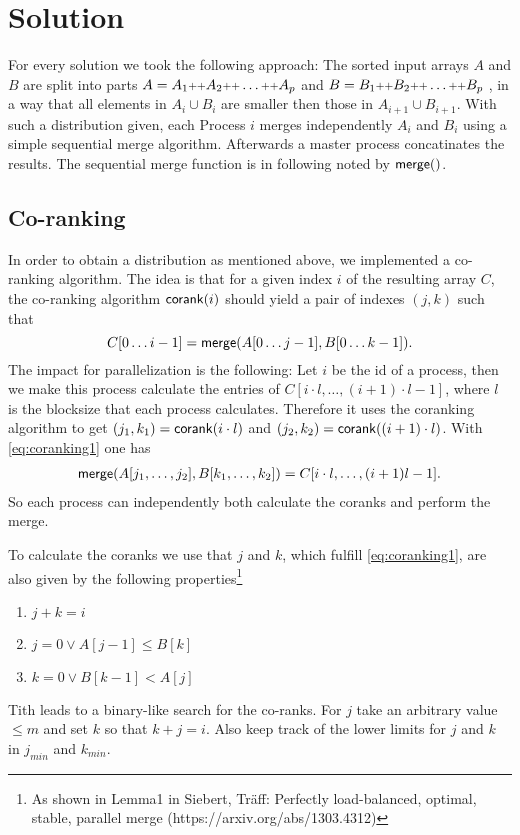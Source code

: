 \section{Solution}
For every solution we took the following approach:
The sorted input arrays $A$ and $B$ are split into parts
$A = A_1 \concat A_2 \concat \ldots \concat A_p$  and
$B = B_1 \concat B_2 \concat \ldots \concat B_p$
, in a way that all elements in $A_i \cup B_i$ are smaller then those in $A_{i+1} \cup B_{i+1}$. 
With such a distribution given, each Process $i$ merges independently $A_i$ and $B_i$ using a simple sequential merge algorithm.
Afterwards a master process concatinates the results.
The sequential merge function is in following noted by $\merge()$.

\subsection{Co-ranking}
In order to obtain a distribution as mentioned above, we implemented a co-ranking algorithm.
The idea is that for a given index $i$ of the resulting array $C$, 
the co-ranking algorithm $\corank(i)$ should yield a pair of indexes $(j,k)$
such that
\begin{equation}\label{eq:coranking1}
  C[0\ldots i-1] = \merge(A[0\ldots j-1],B[0\ldots k-1]).
\end{equation}
The impact for parallelization is the following:
Let $i$ be the id of a process,
then we make this process calculate the entries of $C[i \cdot l, \ldots, (i+1)\cdot l - 1]$,
where $l$ is the blocksize that each process calculates.
Therefore it uses the coranking algorithm to get
$(j_1,k_1) = \corank(i\cdot l)$ and $(j_2,k_2) = \corank((i+1)\cdot l)$.
With \eqref{eq:coranking1} one has
\begin{align*}
  \merge(A[j_1,\ldots,j_2],B[k_1,\ldots,k_2]) = C[i \cdot l,\ldots, (i+1)l - 1].
\end{align*}
So each process can independently both calculate the coranks and perform the merge.

To calculate the coranks we use that
$j$ and $k$, which fulfill \eqref{eq:coranking1}, are also given by the following
properties\footnote{As shown in Lemma1 in Siebert, Träff: Perfectly load-balanced, optimal, stable, parallel merge (https://arxiv.org/abs/1303.4312)}
\begin{enumerate}
  \item $j + k = i$
  \item $j = 0 \vee A[j-1] \leq B[k]$\label{first_inequal}
  \item $k = 0 \vee B[k-1] < A[j]$
\end{enumerate}
Tith leads to a binary-like search for the co-ranks.
For $j$ take an arbitrary value $\leq m$ and set $k$ so that $k + j = i$.
Also keep track of the lower limits for $j$ and $k$ in $j_{min}$ and $k_{min}$.

